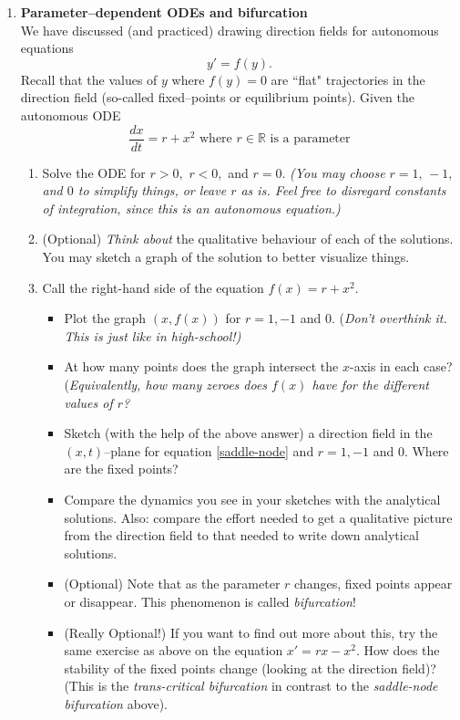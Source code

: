 \documentclass[a4paper,12pt,reqno]{article}
\begin{document}

\begin{enumerate}
\item \textbf{Parameter--dependent ODEs and bifurcation}\\
We have discussed (and practiced) drawing direction fields for autonomous equations \[ y' = f(y). \]
Recall that the values of $y$ where $f(y) = 0$ are ``flat" trajectories in the direction field (so-called fixed--points or equilibrium points).
Given the autonomous ODE
\begin{equation}
\label{saddle-node}
\frac{dx}{dt} = r + x^2 \text{ where } r \in \mathbb{R} \text{ is a parameter}
\end{equation}
\begin{enumerate}
\item Solve the ODE for $r>0,$ $r<0,$ and $r = 0.$ \emph{(You may choose $r =1, \, -1,$ and $0$ to simplify things, or leave $r$ as is. Feel free to disregard constants of integration, since this is an autonomous equation.)}
\item (Optional) \emph{Think about} the qualitative behaviour of each of the solutions. You may sketch a graph of the solution to better visualize things.
\item Call the right-hand side of the equation $f(x) = r+x^2.$
\begin{itemize}
\item Plot the graph $(x,f(x))$ for $r = 1, -1$ and $0.$ (\emph{Don't overthink it. This is just like in high-school!)}
\item At how many points does the graph intersect the $x$-axis in each case? (\emph{Equivalently, how many zeroes does $f(x)$ have for the different values of $r$?}
\item Sketch (with the help of the above answer) a direction field in the $(x,t)$--plane for equation \eqref{saddle-node} and $r = 1, -1$ and $0.$ Where are the fixed points?
\item Compare the dynamics you see in your sketches with the analytical solutions. Also: compare the effort needed to get a qualitative picture from the direction field to that needed to write down analytical solutions.
\item (Optional) Note that as the parameter $r$ changes, fixed points appear or disappear. This phenomenon is called \emph{bifurcation}! 
\item \begin{small}(Really Optional!) If you want to find out more about this, try the same exercise as above on the equation $x' = rx - x^2.$ How does the stability of the fixed points change (looking at the direction field)? (This is the \emph{trans-critical bifurcation} in contrast to the \emph{saddle-node bifurcation} above).\end{small}

\end{itemize}
\end{enumerate}
\end{enumerate}
\end{document}
